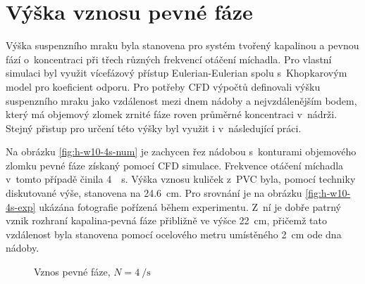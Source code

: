 \section{Výška vznosu pevné fáze}
Výška suspenzního mraku byla stanovena pro systém tvořený kapalinou \pvpS{} a pevnou fází o~koncentraci  při třech různých frekvencí otáčení míchadla. Pro vlastní simulaci byl využit vícefázový přístup Eulerian-Eulerian spolu s~Khopkarovým model pro koeficient odporu. Pro potřeby CFD výpočtů  definovali \citet{kas08} výšku suspenzního mraku jako vzdálenost mezi dnem nádoby a nejvzdálenějším bodem, který má objemový zlomek zrnité fáze roven průměrné koncentraci v~nádrži. Stejný přistup pro určení této výšky byl využit i v~následující práci.  

Na obrázku \ref{fig:h-w10-4s-num} je zachycen řez nádobou s~konturami objemového zlomku pevné fáze získaný pomocí CFD simulace. Frekvence otáčení míchadla v~tomto případě činila \SI{4}{\per\second}. Výška vznosu kuliček z~PVC byla, pomocí techniky diskutované výše, stanovena na \SI{24.6}{\centi\meter}. Pro srovnání je na obrázku \ref{fig:h-w10-4s-exp} ukázána fotografie pořízená během experimentu. Z~ní je dobře patrný vznik rozhraní kapalina-pevná fáze přibližně ve výšce \SI{22}{\centi\meter}, přičemž tato vzdálenost byla stanovena pomocí ocelového metru umístěného \SI{2}{\centi\meter} ode dna nádoby.

\begin{figure}[h!]
 \centering
  \qquad 
  \caption{Vznos pevné fáze, $N=\SI{4}{\per\second}$}
  \label{fig:h-w10-4s}
\end{figure}

